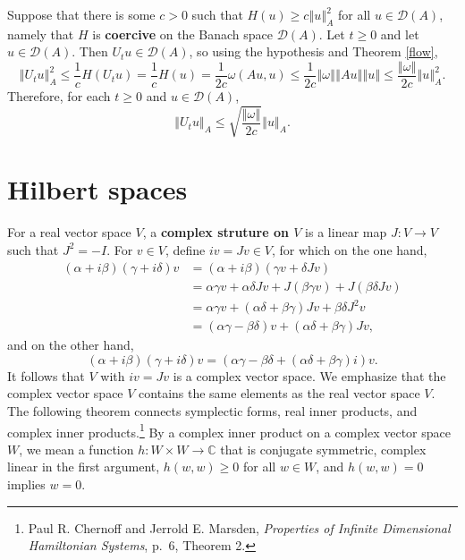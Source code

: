 \documentclass{article}
\newcommand{\norm}[1]{\left\Vert #1 \right\Vert}
\theoremstyle{definition}
\theoremstyle{definition}
\begin{document}
Suppose that there is some $c>0$ such that $H(u) \geq c \norm{u}_A^2$ for all $u \in \mathscr{D}(A)$, namely
that $H$ is \textbf{coercive} on the Banach space $\mathscr{D}(A)$.
Let $t \geq 0$ and 
let $u \in \mathscr{D}(A)$. 
Then $U_t u \in \mathscr{D}(A)$, so using the hypothesis and Theorem \ref{flow},
\[
\norm{U_t u}_A^2 \leq \frac{1}{c} H(U_t u)=\frac{1}{c}H(u)
=\frac{1}{2c}\omega(Au,u)
\leq \frac{1}{2c} \norm{\omega} \norm{Au} \norm{u}
\leq \frac{\norm{\omega}}{2c} \norm{u}_A^2.
\]
Therefore, for each $t \geq 0$ and $u \in \mathscr{D}(A)$,
\[
\norm{U_t u}_A \leq \sqrt{\frac{\norm{\omega}}{2c}} \norm{u}_A.
\]



\section{Hilbert spaces}
For a real vector space $V$, a \textbf{complex struture on $V$} is a linear map
$J:V \to V$ such that $J^2=-I$.
For $v \in V$, define $iv=Jv \in V$,
for which on the one hand,
\begin{align*}
(\alpha+i\beta)(\gamma+i\delta)v &= 
(\alpha+i\beta)(\gamma v + \delta Jv)\\
&=\alpha \gamma v + \alpha \delta Jv
+J(\beta \gamma v) + J(\beta \delta Jv)\\
&=\alpha \gamma v+(\alpha \delta+\beta \gamma)Jv + \beta \delta J^2 v\\
&=(\alpha \gamma - \beta \delta)v + (\alpha \delta+\beta \gamma)Jv,
\end{align*}
and on the other hand,
\[
(\alpha+i\beta)(\gamma+i\delta)v  = (\alpha \gamma-\beta \delta + (\alpha \delta + \beta \gamma)i)v.
\]
It follows that $V$ with $iv=Jv$ is a complex vector space. We emphasize that the complex vector space $V$ contains the same
elements as the real vector space $V$.
The following theorem connects symplectic forms, real inner products, and complex inner products.\footnote{Paul R. Chernoff and Jerrold E. Marsden, {\em Properties of Infinite Dimensional Hamiltonian Systems}, p.~6, Theorem 2.} By a complex inner product on a complex vector space
$W$, we mean a function $h:W \times W \to \mathbb{C}$ that is conjugate symmetric, complex linear in the first argument, $h(w,w) \geq 0$
for all $w \in W$, and $h(w,w)=0$ implies $w=0$.
\end{document}
